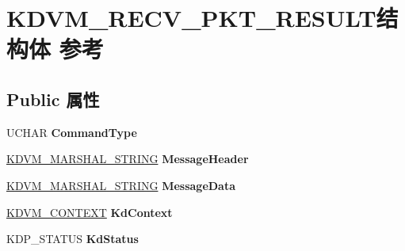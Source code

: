 \hypertarget{struct_k_d_v_m___r_e_c_v___p_k_t___r_e_s_u_l_t}{}\section{K\+D\+V\+M\+\_\+\+R\+E\+C\+V\+\_\+\+P\+K\+T\+\_\+\+R\+E\+S\+U\+L\+T结构体 参考}
\label{struct_k_d_v_m___r_e_c_v___p_k_t___r_e_s_u_l_t}
\subsection*{Public 属性}
\begin{DoxyCompactItemize}
\item 
\mbox{\label{struct_k_d_v_m___r_e_c_v___p_k_t___r_e_s_u_l_t_a3bd775aca775f9129f676f7cd7e70827}} 
U\+C\+H\+AR {\bfseries Command\+Type}
\item 
\mbox{\label{struct_k_d_v_m___r_e_c_v___p_k_t___r_e_s_u_l_t_aabb3661410c12d99abf7ce6fc9a1da3e}} 
\hyperlink{struct___k_d_v_m___m_a_r_s_h_a_l___s_t_r_i_n_g}{K\+D\+V\+M\+\_\+\+M\+A\+R\+S\+H\+A\+L\+\_\+\+S\+T\+R\+I\+NG} {\bfseries Message\+Header}
\item 
\mbox{\label{struct_k_d_v_m___r_e_c_v___p_k_t___r_e_s_u_l_t_a07e0c4b965eee1ebc5320bd0ea394459}} 
\hyperlink{struct___k_d_v_m___m_a_r_s_h_a_l___s_t_r_i_n_g}{K\+D\+V\+M\+\_\+\+M\+A\+R\+S\+H\+A\+L\+\_\+\+S\+T\+R\+I\+NG} {\bfseries Message\+Data}
\item 
\mbox{\label{struct_k_d_v_m___r_e_c_v___p_k_t___r_e_s_u_l_t_a7dc8e698b50c758b3452998bd2407e69}} 
\hyperlink{struct___k_d_v_m___c_o_n_t_e_x_t}{K\+D\+V\+M\+\_\+\+C\+O\+N\+T\+E\+XT} {\bfseries Kd\+Context}
\item 
\mbox{\label{struct_k_d_v_m___r_e_c_v___p_k_t___r_e_s_u_l_t_a450039f79f5369937452353ab665a458}} 
K\+D\+P\+\_\+\+S\+T\+A\+T\+US {\bfseries Kd\+Status}
\item 
\mbox{\label{struct_k_d_v_m___r_e_c_v___p_k_t___r_e_s_u_l_t_a0abb87aa07fa5710f472cf89f2156478}} 

\end{DoxyCompactItemize}
